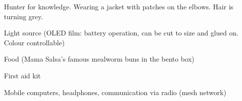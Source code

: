 \begin{npcBox}[title=Books]
    \begin{npcDescription}
    Hunter for knowledge. Wearing a jacket with patches on the elbows. Hair is turning grey.
    \end{npcDescription}


    \begin{equipment}
    \item Light source (OLED film: battery operation, can be cut to size and glued on. Colour controllable)
    \item Food (Mama Salsa's famous mealworm buns in the bento box)
    \item First aid kit
    \item Mobile computers, headphones, communication via radio (mesh network)
    \end{equipment}
    
\end{npcBox}


